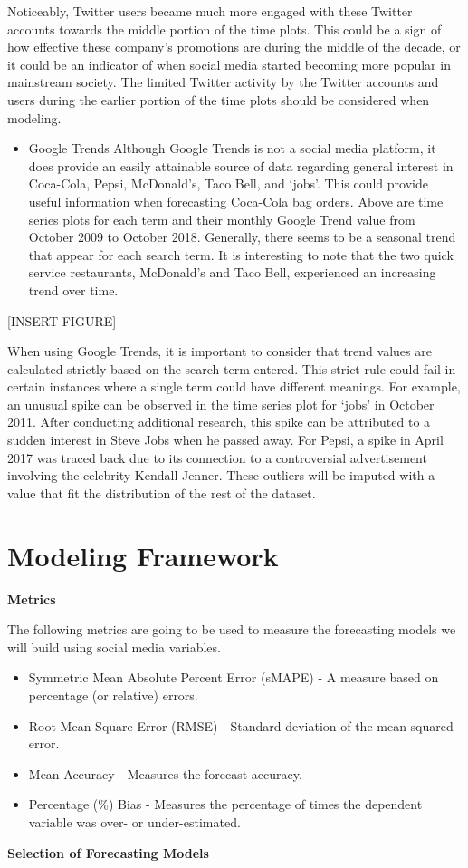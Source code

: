 \documentclass[12pt,oneside]{chicagocapstone}
\providecommand{\tightlist}{%
  \setlength{\itemsep}{0pt}\setlength{\parskip}{0pt}}
\begin{document}
Noticeably, Twitter users became much more engaged with these Twitter
accounts towards the middle portion of the time plots. This could be a
sign of how effective these company's promotions are during the middle
of the decade, or it could be an indicator of when social media started
becoming more popular in mainstream society. The limited Twitter
activity by the Twitter accounts and users during the earlier portion of
the time plots should be considered when modeling.
\begin{itemize}
\tightlist
\item
  Google Trends Although Google Trends is not a social media platform,
  it does provide an easily attainable source of data regarding general
  interest in Coca-Cola, Pepsi, McDonald's, Taco Bell, and `jobs'. This
  could provide useful information when forecasting Coca-Cola bag
  orders. Above are time series plots for each term and their monthly
  Google Trend value from October 2009 to October 2018. Generally, there
  seems to be a seasonal trend that appear for each search term. It is
  interesting to note that the two quick service restaurants, McDonald's
  and Taco Bell, experienced an increasing trend over time.
\end{itemize}
{[}INSERT FIGURE{]}

When using Google Trends, it is important to consider that trend values
are calculated strictly based on the search term entered. This strict
rule could fail in certain instances where a single term could have
different meanings. For example, an unusual spike can be observed in the
time series plot for `jobs' in October 2011. After conducting additional
research, this spike can be attributed to a sudden interest in Steve
Jobs when he passed away. For Pepsi, a spike in April 2017 was traced
back due to its connection to a controversial advertisement involving
the celebrity Kendall Jenner. These outliers will be imputed with a
value that fit the distribution of the rest of the dataset.

\newpage

\section*{Modeling Framework}\label{methodology-modeling}

\textbf{Metrics}

The following metrics are going to be used to measure the forecasting
models we will build using social media variables.
\begin{itemize}
\item
  Symmetric Mean Absolute Percent Error (sMAPE) - A measure based on
  percentage (or relative) errors.
\item
  Root Mean Square Error (RMSE) - Standard deviation of the mean squared
  error.
\item
  Mean Accuracy - Measures the forecast accuracy.
\item
  Percentage (\%) Bias - Measures the percentage of times the dependent
  variable was over- or under-estimated.
\end{itemize}
\textbf{Selection of Forecasting Models}
\end{document}
